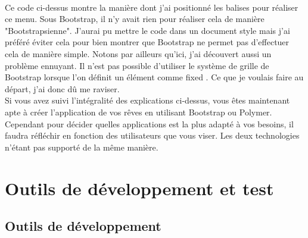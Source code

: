 \documentclass{article}
\begin{document}
\vspace{0.5cm}\\
Ce code ci-dessus montre la mani\`ere dont j'ai positionn\'e les balises pour r\'ealiser ce menu. Sous Bootstrap, il n'y avait rien pour r\'ealiser cela de mani\`ere "Bootstrapsienne". J'aurai pu mettre le code dans un document style mais j'ai pr\'ef\'er\'e \'eviter cela pour bien montrer que Bootstrap ne permet pas d'effectuer cela de mani\`ere simple. Notons par ailleurs qu'ici, j'ai d\'ecouvert aussi un probl\`eme ennuyant. Il n'est pas possible d'utiliser le syst\`eme de grille de Bootstrap lorsque l'on d\'efinit un \'el\'ement comme \og fixed \fg{}. Ce que je voulais faire au d\'epart, j'ai donc d\^u me raviser.
\vspace{0.5cm}\\
Si vous avez suivi l'int\'egralit\'e des explications ci-dessus, vous \^etes maintenant apte \`a cr\'eer l'application de vos r\^eves en utilisant Bootstrap ou Polymer. Cependant pour d\'ecider quelles applications est la plus adapt\'e \`a vos besoins, il faudra r\'efl\'echir en fonction des utilisateurs que vous viser. Les deux technologies n'\'etant pas support\'e de la m\^eme mani\`ere.
 
\newpage
\section{Outils de d\'eveloppement et test}

\subsection{Outils de d\'eveloppement}
\end{document}
